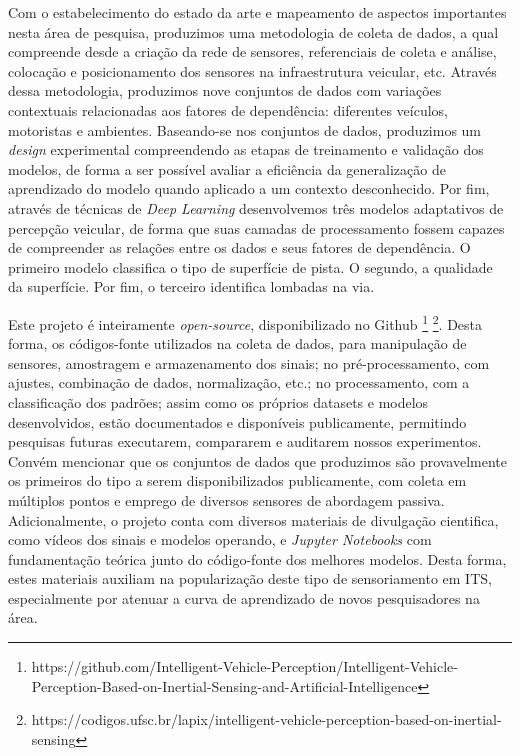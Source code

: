 Com o estabelecimento do estado da arte e mapeamento de aspectos importantes nesta área de pesquisa, produzimos uma metodologia de coleta de dados, a qual compreende desde a criação da rede de sensores, referenciais de coleta e análise, colocação e posicionamento dos sensores na infraestrutura veicular, etc. Através dessa metodologia, produzimos nove conjuntos de dados com variações contextuais relacionadas aos fatores de dependência: diferentes veículos, motoristas e ambientes. Baseando-se nos conjuntos de dados, produzimos um \textit{design} experimental compreendendo as etapas de treinamento e validação dos modelos, de forma a ser possível avaliar a eficiência da generalização de aprendizado do modelo quando aplicado a um contexto desconhecido. Por fim, através de técnicas de \textit{Deep Learning} desenvolvemos três modelos adaptativos de percepção veicular, de forma que suas camadas de processamento fossem capazes de compreender as relações entre os dados e seus fatores de dependência. O primeiro modelo classifica o tipo de superfície de pista. O segundo, a qualidade da superfície. Por fim, o terceiro identifica lombadas na via.

Este projeto é inteiramente \textit{open-source}, disponibilizado no Github \footnote{https://github.com/Intelligent-Vehicle-Perception/Intelligent-Vehicle-Perception-Based-on-Inertial-Sensing-and-Artificial-Intelligence} \footnote{https://codigos.ufsc.br/lapix/intelligent-vehicle-perception-based-on-inertial-sensing}. Desta forma, os códigos-fonte utilizados na coleta de dados, para manipulação de sensores, amostragem e armazenamento dos sinais; no pré-processamento, com ajustes, combinação de dados, normalização, etc.; no processamento, com a classificação dos padrões; assim como os próprios datasets e modelos desenvolvidos, estão documentados e disponíveis publicamente, permitindo pesquisas futuras executarem, compararem e auditarem nossos experimentos. Convém mencionar que os conjuntos de dados que produzimos são provavelmente os primeiros do tipo a serem disponibilizados publicamente, com coleta em múltiplos pontos e emprego de diversos sensores de abordagem passiva. Adicionalmente, o projeto conta com diversos materiais de divulgação cientifica, como vídeos dos sinais e modelos operando, e \textit{Jupyter Notebooks} com fundamentação teórica junto do código-fonte dos melhores modelos. Desta forma, estes materiais auxiliam na popularização deste tipo de sensoriamento em ITS, especialmente por atenuar a curva de aprendizado de novos pesquisadores na área.
 
